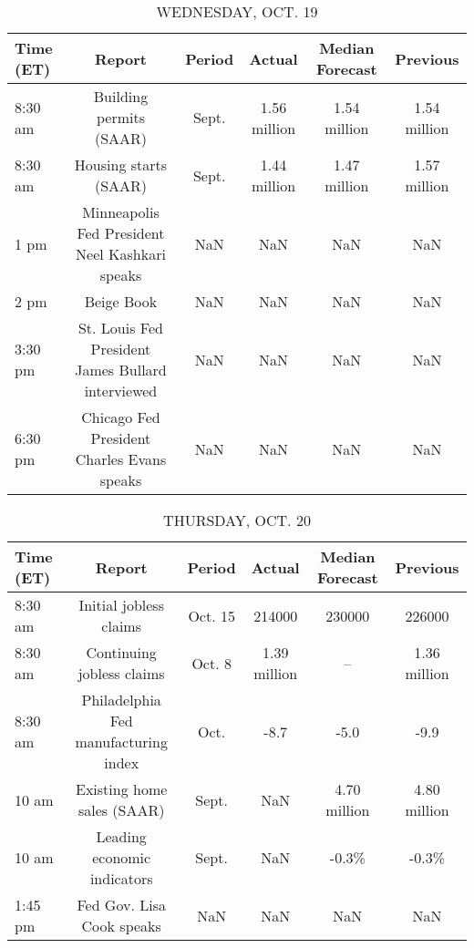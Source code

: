 \documentclass{article}%
\begin{document}
\begin{table}[htbp]%
\caption{WEDNESDAY, OCT. 19}%
\centering%
\begin{adjustbox}{width=1\textwidth}%
\begin{tabular}{lccccc}
\toprule
Time (ET) &                                            Report & Period &       Actual & Median Forecast &     Previous \\
\midrule
  8:30 am &                           Building permits (SAAR) &  Sept. & 1.56 million &    1.54 million & 1.54 million \\
  8:30 am &                             Housing starts (SAAR) &  Sept. & 1.44 million &    1.47 million & 1.57 million \\
     1 pm &    Minneapolis Fed President Neel Kashkari speaks &    NaN &          NaN &             NaN &          NaN \\
     2 pm &                                        Beige Book &    NaN &          NaN &             NaN &          NaN \\
  3:30 pm & St. Louis Fed President James Bullard interviewed &    NaN &          NaN &             NaN &          NaN \\
  6:30 pm &        Chicago Fed President Charles Evans speaks &    NaN &          NaN &             NaN &          NaN \\
\bottomrule
\end{tabular}
%
\end{adjustbox}%
\end{table}

%


\begin{table}[htbp]%
\caption{THURSDAY, OCT. 20}%
\centering%
\begin{adjustbox}{width=1\textwidth}%
\begin{tabular}{lccccc}
\toprule
Time (ET) &                               Report &  Period &       Actual & Median Forecast &     Previous \\
\midrule
  8:30 am &               Initial jobless claims & Oct. 15 &       214000 &          230000 &       226000 \\
  8:30 am &            Continuing jobless claims &  Oct. 8 & 1.39 million &              -- & 1.36 million \\
  8:30 am & Philadelphia Fed manufacturing index &    Oct. &         -8.7 &            -5.0 &         -9.9 \\
    10 am &           Existing home sales (SAAR) &   Sept. &          NaN &    4.70 million & 4.80 million \\
    10 am &          Leading economic indicators &   Sept. &          NaN &           -0.3\% &        -0.3\% \\
  1:45 pm &            Fed Gov. Lisa Cook speaks &     NaN &          NaN &             NaN &          NaN \\
\bottomrule
\end{tabular}
%
\end{adjustbox}%
\end{table}
\end{document}
